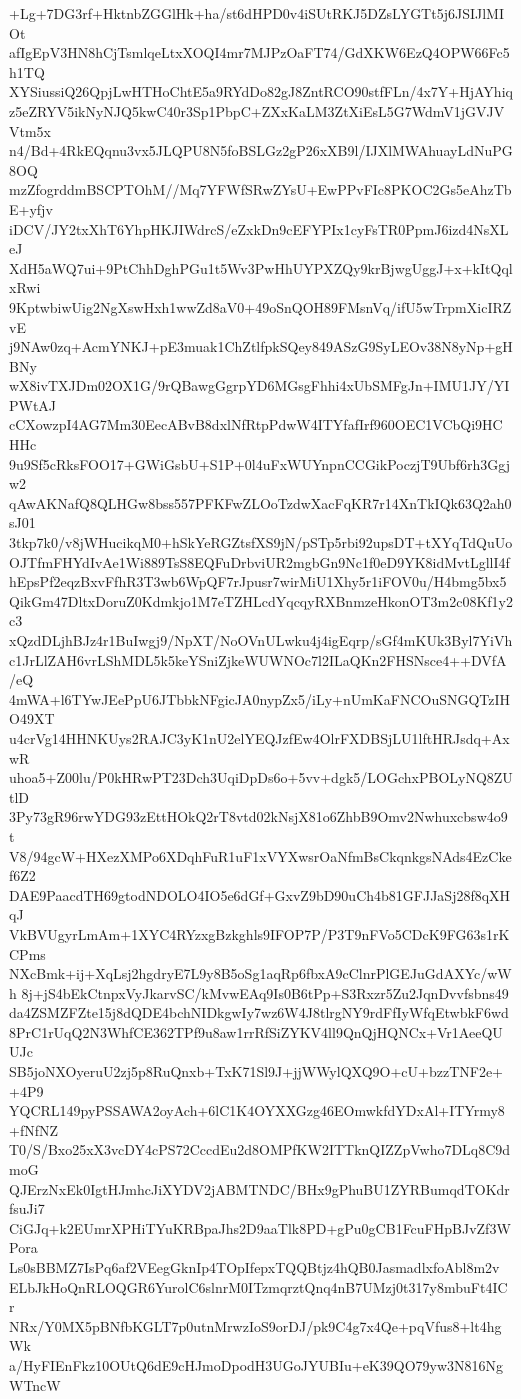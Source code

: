 +Lg+7DG3rf+HktnbZGGlHk+ha/st6dHPD0v4iSUtRKJ5DZsLYGTt5j6JSIJlMIOt
afIgEpV3HN8hCjTsmlqeLtxXOQI4mr7MJPzOaFT74/GdXKW6EzQ4OPW66Fc5h1TQ
XYSiussiQ26QpjLwHTHoChtE5a9RYdDo82gJ8ZntRCO90stfFLn/4x7Y+HjAYhiq
z5eZRYV5ikNyNJQ5kwC40r3Sp1PbpC+ZXxKaLM3ZtXiEsL5G7WdmV1jGVJVVtm5x
n4/Bd+4RkEQqnu3vx5JLQPU8N5foBSLGz2gP26xXB9l/IJXlMWAhuayLdNuPG8OQ
mzZfogrddmBSCPTOhM//Mq7YFWfSRwZYsU+EwPPvFIc8PKOC2Gs5eAhzTbE+yfjv
iDCV/JY2txXhT6YhpHKJIWdrcS/eZxkDn9cEFYPIx1cyFsTR0PpmJ6izd4NsXLeJ
XdH5aWQ7ui+9PtChhDghPGu1t5Wv3PwHhUYPXZQy9krBjwgUggJ+x+kItQqlxRwi
9KptwbiwUig2NgXswHxh1wwZd8aV0+49oSnQOH89FMsnVq/ifU5wTrpmXicIRZvE
j9NAw0zq+AcmYNKJ+pE3muak1ChZtlfpkSQey849ASzG9SyLEOv38N8yNp+gHBNy
wX8ivTXJDm02OX1G/9rQBawgGgrpYD6MGsgFhhi4xUbSMFgJn+IMU1JY/YIPWtAJ
cCXowzpI4AG7Mm30EecABvB8dxlNfRtpPdwW4ITYfafIrf960OEC1VCbQi9HCHHc
9u9Sf5cRksFOO17+GWiGsbU+S1P+0l4uFxWUYnpnCCGikPoczjT9Ubf6rh3Ggjw2
qAwAKNafQ8QLHGw8bss557PFKFwZLOoTzdwXacFqKR7r14XnTkIQk63Q2ah0sJ01
3tkp7k0/v8jWHucikqM0+hSkYeRGZtsfXS9jN/pSTp5rbi92upsDT+tXYqTdQuUo
OJTfmFHYdIvAe1Wi889TsS8EQFuDrbviUR2mgbGn9Nc1f0eD9YK8idMvtLgllI4f
hEpsPf2eqzBxvFfhR3T3wb6WpQF7rJpusr7wirMiU1Xhy5r1iFOV0u/H4bmg5bx5
QikGm47DltxDoruZ0Kdmkjo1M7eTZHLcdYqcqyRXBnmzeHkonOT3m2c08Kf1y2c3
xQzdDLjhBJz4r1BuIwgj9/NpXT/NoOVnULwku4j4igEqrp/sGf4mKUk3Byl7YiVh
c1JrLlZAH6vrLShMDL5k5keYSniZjkeWUWNOc7l2ILaQKn2FHSNsce4++DVfA/eQ
4mWA+l6TYwJEePpU6JTbbkNFgicJA0nypZx5/iLy+nUmKaFNCOuSNGQTzIHO49XT
u4crVg14HHNKUys2RAJC3yK1nU2elYEQJzfEw4OlrFXDBSjLU1lftHRJsdq+AxwR
uhoa5+Z00lu/P0kHRwPT23Dch3UqiDpDs6o+5vv+dgk5/LOGchxPBOLyNQ8ZUtlD
3Py73gR96rwYDG93zEttHOkQ2rT8vtd02kNsjX81o6ZhbB9Omv2Nwhuxcbsw4o9t
V8/94gcW+HXezXMPo6XDqhFuR1uF1xVYXwsrOaNfmBsCkqnkgsNAds4EzCkef6Z2
DAE9PaacdTH69gtodNDOLO4IO5e6dGf+GxvZ9bD90uCh4b81GFJJaSj28f8qXHqJ
VkBVUgyrLmAm+1XYC4RYzxgBzkghls9IFOP7P/P3T9nFVo5CDcK9FG63s1rKCPms
NXcBmk+ij+XqLsj2hgdryE7L9y8B5oSg1aqRp6fbxA9cClnrPlGEJuGdAXYc/wWh
8j+jS4bEkCtnpxVyJkarvSC/kMvwEAq9Is0B6tPp+S3Rxzr5Zu2JqnDvvfsbns49
da4ZSMZFZte15j8dQDE4bchNIDkgwIy7wz6W4J8tlrgNY9rdFfIyWfqEtwbkF6wd
8PrC1rUqQ2N3WhfCE362TPf9u8aw1rrRfSiZYKV4ll9QnQjHQNCx+Vr1AeeQUUJc
SB5joNXOyeruU2zj5p8RuQnxb+TxK71Sl9J+jjWWylQXQ9O+cU+bzzTNF2e++4P9
YQCRL149pyPSSAWA2oyAch+6lC1K4OYXXGzg46EOmwkfdYDxAl+ITYrmy8+fNfNZ
T0/S/Bxo25xX3vcDY4cPS72CccdEu2d8OMPfKW2ITTknQIZZpVwho7DLq8C9dmoG
QJErzNxEk0IgtHJmhcJiXYDV2jABMTNDC/BHx9gPhuBU1ZYRBumqdTOKdrfsuJi7
CiGJq+k2EUmrXPHiTYuKRBpaJhs2D9aaTlk8PD+gPu0gCB1FcuFHpBJvZf3WPora
Ls0sBBMZ7IsPq6af2VEegGknIp4TOpIfepxTQQBtjz4hQB0JasmadlxfoAbl8m2v
ELbJkHoQnRLOQGR6YurolC6slnrM0ITzmqrztQnq4nB7UMzj0t317y8mbuFt4ICr
NRx/Y0MX5pBNfbKGLT7p0utnMrwzIoS9orDJ/pk9C4g7x4Qe+pqVfus8+lt4hgWk
a/HyFIEnFkz10OUtQ6dE9cHJmoDpodH3UGoJYUBIu+eK39QO79yw3N816NgWTncW

